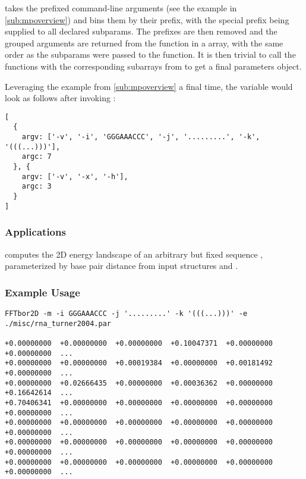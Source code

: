 \documentclass[11pt]{article}
\begin{document}
 takes the prefixed command-line arguments (see the example in \ref{sub:mpoverview}) and bins them by their prefix, with the special  prefix being supplied to all declared subparams. The prefixes are then removed and the grouped arguments are returned from the function in a  array, with the same order as the subparams were passed to the function. It is then trivial to call the  functions with the corresponding subarrays from  to get a final parameters object.

Leveraging the example from \ref{sub:mpoverview} a final time, the variable  would look as follows after invoking :
\begin{verbatim}
[
  {
    argv: ['-v', '-i', 'GGGAAACCC', '-j', '.........', '-k', '(((...)))'],
    argc: 7
  }, {
    argv: ['-v', '-x', '-h'],
    argc: 3
  }
]
\end{verbatim}



\subsubsection{Applications} \label{subsub:fftborapp}

\fft computes the 2D energy landscape of an arbitrary but fixed sequence \s, parameterized by base pair distance from input structures \A and \B.

\subsubsection{Example Usage} \label{subsub:fftborex}

\begin{verbatim}
FFTbor2D -m -i GGGAAACCC -j '.........' -k '(((...)))' -e ./misc/rna_turner2004.par

+0.00000000  +0.00000000  +0.00000000  +0.10047371  +0.00000000  +0.00000000  ...
+0.00000000  +0.00000000  +0.00019384  +0.00000000  +0.00181492  +0.00000000  ...
+0.00000000  +0.02666435  +0.00000000  +0.00036362  +0.00000000  +0.16642614  ...
+0.70406341  +0.00000000  +0.00000000  +0.00000000  +0.00000000  +0.00000000  ...
+0.00000000  +0.00000000  +0.00000000  +0.00000000  +0.00000000  +0.00000000  ...
+0.00000000  +0.00000000  +0.00000000  +0.00000000  +0.00000000  +0.00000000  ...
+0.00000000  +0.00000000  +0.00000000  +0.00000000  +0.00000000  +0.00000000  ...
\end{verbatim}
\end{document}
